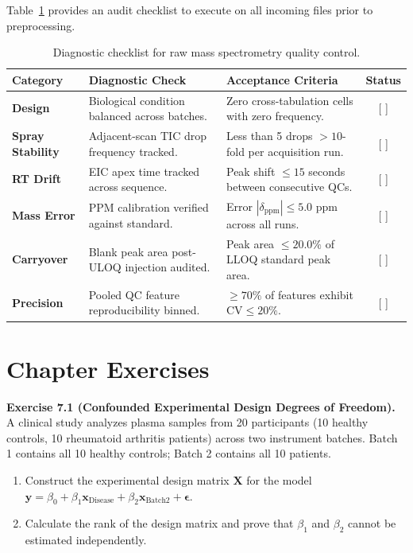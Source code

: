 \documentclass[11pt,twoside,openright]{book}
\begin{document}
Table~\ref{tab:qc_checklist} provides an audit checklist to execute on all incoming files prior to preprocessing.

\begin{table}[htbp]
\centering
\caption{Diagnostic checklist for raw mass spectrometry quality control.}
\label{tab:qc_checklist}
\small
\begin{tabularx}{\textwidth}{>{\raggedright\arraybackslash}l >{\raggedright\arraybackslash}p{5.2cm} >{\raggedright\arraybackslash}X c}
\toprule
\textbf{Category} & \textbf{Diagnostic Check} & \textbf{Acceptance Criteria} & \textbf{Status} \\
\midrule
\textbf{Design} & Biological condition balanced across batches. & Zero cross-tabulation cells with zero frequency. & [ ] \\
\addlinespace
\textbf{Spray Stability} & Adjacent-scan TIC drop frequency tracked. & Less than 5 drops $>10$-fold per acquisition run. & [ ] \\
\addlinespace
\textbf{RT Drift} & EIC apex time tracked across sequence. & Peak shift $\le 15$ seconds between consecutive QCs. & [ ] \\
\addlinespace
\textbf{Mass Error} & PPM calibration verified against standard. & Error $|\delta_{\text{ppm}}| \le 5.0$ ppm across all runs. & [ ] \\
\addlinespace
\textbf{Carryover} & Blank peak area post-ULOQ injection audited. & Peak area $\le 20.0\%$ of LLOQ standard peak area. & [ ] \\
\addlinespace
\textbf{Precision} & Pooled QC feature reproducibility binned. & $\ge 70\%$ of features exhibit $\text{CV} \le 20\%$. & [ ] \\
\bottomrule
\end{tabularx}
\end{table}

\FloatBarrier

\section{Chapter Exercises}
\label{sec:chapter_exercises}

\noindent\textbf{Exercise 7.1 (Confounded Experimental Design Degrees of Freedom).}\enspace
\label{ex:confounding_degrees_freedom}
A clinical study analyzes plasma samples from 20 participants (10 healthy controls, 10 rheumatoid arthritis patients) across two instrument batches. Batch 1 contains all 10 healthy controls; Batch 2 contains all 10 patients.
\begin{enumerate}
    \item Construct the experimental design matrix $\mathbf{X}$ for the model $\mathbf{y} = \beta_0 + \beta_1 \mathbf{x}_{\text{Disease}} + \beta_2 \mathbf{x}_{\text{Batch2}} + \boldsymbol{\epsilon}$.
    \item Calculate the rank of the design matrix and prove that $\beta_1$ and $\beta_2$ cannot be estimated independently.
\end{enumerate}
\end{document}
